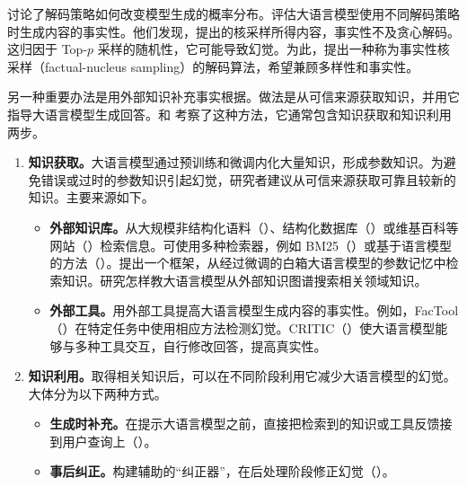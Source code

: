 \begin{practicaltip}
讨论了解码策略如何改变模型生成的概率分布。评估大语言模型使用不同解码策略时生成内容的事实性。他们发现，提出的核采样所得内容，事实性不及贪心解码。这归因于 Top-$p$ 采样的随机性，它可能导致幻觉。为此，提出一种称为事实性核采样（factual-nucleus sampling）的解码算法，希望兼顾多样性和事实性。
\end{practicaltip}

另一种重要办法是用外部知识补充事实根据。做法是从可信来源获取知识，并用它指导大语言模型生成回答。和 考察了这种方法，它通常包含知识获取和知识利用两步。

\begin{enumerate}
\item \textbf{知识获取。}大语言模型通过预训练和微调内化大量知识，形成参数知识。为避免错误或过时的参数知识引起幻觉，研究者建议从可信来源获取可靠且较新的知识。主要来源如下。
  \begin{itemize}
  \item \textbf{外部知识库。}从大规模非结构化语料（）、结构化数据库（）或维基百科等网站（）检索信息。可使用多种检索器，例如 BM25（）或基于语言模型的方法（）。提出一个框架，从经过微调的白箱大语言模型的参数记忆中检索知识。研究怎样教大语言模型从外部知识图谱搜索相关领域知识。
  \item \textbf{外部工具。}用外部工具提高大语言模型生成内容的事实性。例如，FacTool（）在特定任务中使用相应方法检测幻觉。CRITIC（）使大语言模型能够与多种工具交互，自行修改回答，提高真实性。
  \end{itemize}
\item \textbf{知识利用。}取得相关知识后，可以在不同阶段利用它减少大语言模型的幻觉。大体分为以下两种方式。
  \begin{itemize}
  \item \textbf{生成时补充。}在提示大语言模型之前，直接把检索到的知识或工具反馈接到用户查询上（）。
  \item \textbf{事后纠正。}构建辅助的“纠正器”，在后处理阶段修正幻觉（）。
  \end{itemize}
\end{enumerate}


